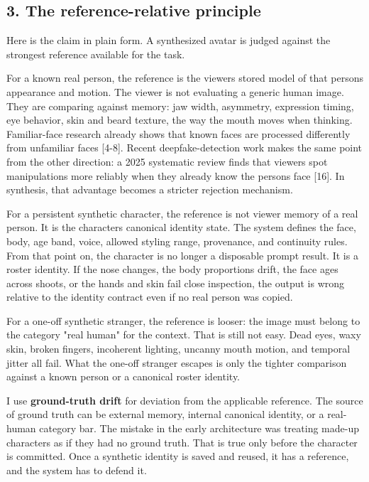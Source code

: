 \documentclass[
]{article}
\begin{document}
\subsection{3. The reference-relative
principle}\label{3-the-reference-relative-principle}

Here is the claim in plain form. A synthesized avatar is judged against
the strongest reference available for the task.

For a known real person, the reference is the viewer\textquotesingle s
stored model of that person\textquotesingle s appearance and motion. The
viewer is not evaluating a generic human image. They are comparing
against memory: jaw width, asymmetry, expression timing, eye behavior,
skin and beard texture, the way the mouth moves when thinking.
Familiar-face research already shows that known faces are processed
differently from unfamiliar faces {[}4-8{]}. Recent deepfake-detection
work makes the same point from the other direction: a 2025 systematic
review finds that viewers spot manipulations more reliably when they
already know the person\textquotesingle s face {[}16{]}. In synthesis,
that advantage becomes a stricter rejection mechanism.

For a persistent synthetic character, the reference is not viewer memory
of a real person. It is the character\textquotesingle s canonical
identity state. The system defines the face, body, age band, voice,
allowed styling range, provenance, and continuity rules. From that point
on, the character is no longer a disposable prompt result. It is a
roster identity. If the nose changes, the body proportions drift, the
face ages across shoots, or the hands and skin fail close inspection,
the output is wrong relative to the identity contract even if no real
person was copied.

For a one-off synthetic stranger, the reference is looser: the image
must belong to the category "real human" for the context. That is still
not easy. Dead eyes, waxy skin, broken fingers, incoherent lighting,
uncanny mouth motion, and temporal jitter all fail. What the one-off
stranger escapes is only the tighter comparison against a known person
or a canonical roster identity.

I use \textbf{ground-truth drift} for deviation from the applicable
reference. The source of ground truth can be external memory, internal
canonical identity, or a real-human category bar. The mistake in the
early architecture was treating made-up characters as if they had no
ground truth. That is true only before the character is committed. Once
a synthetic identity is saved and reused, it has a reference, and the
system has to defend it.
\end{document}
